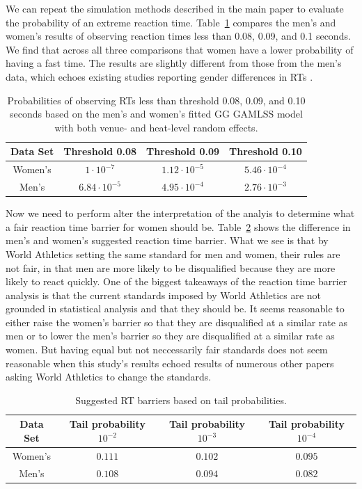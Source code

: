 \documentclass[12pt, letterpaper]{article}
\begin{document}
We can repeat the simulation methods described in the main paper to evaluate
the probability of an extreme reaction time.  Table~\ref{tab:Sim_prob_women}
compares the men's and women's results of observing reaction times less than
0.08, 0.09, and 0.1 seconds.  We find that across all three comparisons that
women have a lower probability of having a fast time. The results are slightly
different from those from the men's data, which echoes existing studies
reporting gender differences in RTs \citep[e.g.,][]{lipps2011implications,
babicc2009reaction, panoutsakopoulos2020gender}.

\begin{table}
  \centering
  \caption{Probabilities of observing RTs less than threshold 0.08,
  0.09, and 0.10 seconds based on the men's and women's
    fitted GG GAMLSS model with both venue- and heat-level
random effects.}
  \begin{tabular}{c c c c}
   \toprule
   Data Set & Threshold 0.08 & Threshold 0.09 & Threshold 0.10  \\
   \midrule
   Women's & $1\cdot10^{-7}$ & $1.12\cdot10^{-5}$ &  $5.46\cdot10^{-4}$  \\
   Men's   & $6.84\cdot10^{-5}$ & $4.95\cdot10^{-4}$ & $2.76\cdot10^{-3}$ \\
   \bottomrule
  \end{tabular}
  \label{tab:Sim_prob_women}
\end{table}


Now we need to perform alter the interpretation of the analyis to determine
what a fair reaction time barrier for women should be.
Table~\ref{tab:Sim_time_women} shows the difference in men's and women's
suggested reaction time barrier.  What we see is that by World Athletics setting
the same standard for men and women, their rules are not fair, in that men are
more likely to be disqualified because they are more likely to react quickly.
One of the biggest takeaways of the reaction time barrier analysis is that the
current standards imposed by World Athletics are not grounded in statistical
analysis and that they should be.  It seems reasonable to either raise the
women's barrier so that they are disqualified at a similar rate as men or to
lower the men's barrier so they are disqualified at a similar rate as women.  But
having equal but not neccessarily fair standards does not seem reasonable when
this study's results echoed results of numerous other papers asking World
Athletics to change the standards.

\begin{table}
  \centering
  \caption{Suggested RT barriers based on tail probabilities.}
  \begin{tabular}{c c c c}
   \toprule
   Data Set & Tail probability  $10^{-2}$ & Tail probability  $10^{-3}$ & Tail probability $10^{-4}$ \\
   \midrule
   Women's & $0.111$ & $0.102$ & $0.095$ \\
   Men's   & $0.108$ & $0.094$ & $0.082$ \\
   \bottomrule
  \end{tabular}
  \label{tab:Sim_time_women}
\end{table}
\end{document}
